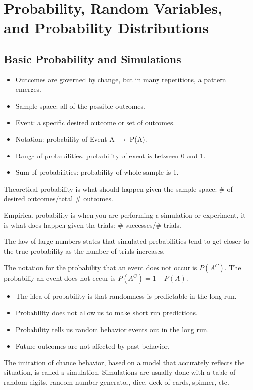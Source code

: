 \documentclass[../stats.tex]{subfiles}
\begin{document}
\chapter{Probability, Random Variables, and Probability Distributions}
\section{Basic Probability and Simulations}
\begin{itemize}
    \item Outcomes are governed by change, but in many repetitions, a pattern emerges.
    \item Sample space: all of the possible outcomes.
    \item Event: a specific desired outcome or set of outcomes.
    \item Notation: probability of Event A $\rightarrow$ P(A).
    \item Range of probabilities: probability of event is between 0 and 1.
    \item Sum of probabilities: probability of whole sample is 1.
\end{itemize}

Theoretical probability is what should happen given the sample space: \# of desired outcomes/total \# outcomes.

Empirical probability is when you are performing a simulation or experiment, it is what does happen given the trials: \# successes/\# trials.

The law of large numbers states that simulated probabilities tend to get closer to the true probability as the number of trials increases. 

The notation for the probability that an event does not occur is $P(A^C)$. The probabiliy an event does not occur is $P(A^C)=1-P(A)$.
\begin{itemize}
    \item The idea of probability is that randomness is predictable in the long run.
    \item Probability does not allow us to make short run predictions.
    \item Probability tells us random behavior events out in the long run.
    \item Future outcomes are not affected by past behavior.
\end{itemize}

The imitation of chance behavior, based on a model that accurately reflects the situation, is called a simulation. Simulations are usually 
done with a table of random digits, random number generator, dice, deck of cards, spinner, etc.
\end{document}
